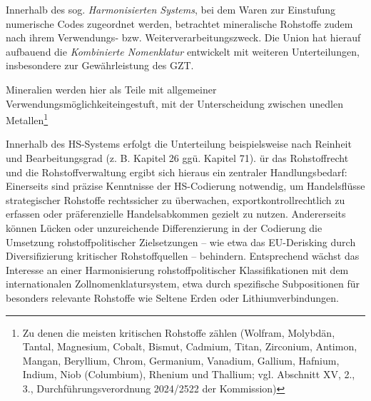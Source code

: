 \documentclass[12pt,a4paper,oneside]{book} %
\begin{document}
Innerhalb des sog. \textit{Harmonisierten Systems}, bei dem Waren zur Einstufung numerische Codes zugeordnet werden, betrachtet mineralische Rohstoffe zudem nach ihrem Verwendungs- bzw. Weiterverarbeitungszweck. Die Union hat hierauf aufbauend die \textit{Kombinierte Nomenklatur} entwickelt mit weiteren Unterteilungen, insbesondere zur Gewährleistung des GZT. 



Mineralien werden hier als \glqq Teile mit allgemeiner Verwendungsmöglichkeit\grqq eingestuft, mit der Unterscheidung zwischen \glqq unedlen Metallen\grqq\footnote{Zu denen die meisten kritischen Rohstoffe zählen (Wolfram, Molybdän, Tantal, Magnesium, Cobalt, Bismut, Cadmium, Titan, Zirconium, Antimon, Mangan, Beryllium, Chrom, Germanium, Vanadium, Gallium, Hafnium, Indium, Niob (Columbium), Rhenium und Thallium; vgl. Abschnitt XV, 2., 3., Durchführungsverordnung 2024/2522 der Kommission)}

Innerhalb des HS-Systems erfolgt die Unterteilung beispielsweise nach Reinheit und Bearbeitungsgrad (z. B. Kapitel 26 ggü. Kapitel 71). ür das Rohstoffrecht und die Rohstoffverwaltung ergibt sich hieraus ein zentraler Handlungsbedarf: Einerseits sind präzise Kenntnisse der HS-Codierung notwendig, um Handelsflüsse strategischer Rohstoffe rechtssicher zu überwachen, exportkontrollrechtlich zu erfassen oder präferenzielle Handelsabkommen gezielt zu nutzen. Andererseits können Lücken oder unzureichende Differenzierung in der Codierung die Umsetzung rohstoffpolitischer Zielsetzungen – wie etwa das EU-Derisking durch Diversifizierung kritischer Rohstoffquellen – behindern. Entsprechend wächst das Interesse an einer Harmonisierung rohstoffpolitischer Klassifikationen mit dem internationalen Zollnomenklatursystem, etwa durch spezifische Subpositionen für besonders relevante Rohstoffe wie Seltene Erden oder Lithiumverbindungen.
\end{document}
